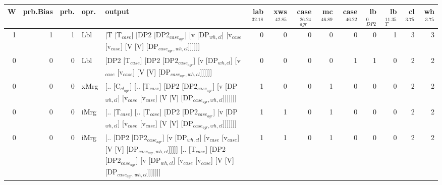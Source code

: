 \begin{tabularx}{\linewidth}{rrrlXrrrrrrrrr}
\hline
   W &   prb.Bias &   prb. & opr.   & output                                                                                                                                                                                 &   lab$^{32.18}$ &   xws$^{42.85}$ &   case$_{agr}^{26.24}$ &   mc$^{46.89}$ &   case$^{46.22}$ &   lb$_{DP2}^{0}$ &   lb$_{T}^{11.35}$ &   cl$^{3.75}$ &   wh$^{3.75}$ \\
\hline
   1 &       1 &   1 & Lbl  & [T [T$_{case}$] [DP2 [DP2$_{case_{agr}}$] [v [DP$_{wh,cl}$] [v$_{case}$ [v$_{case}$] [V [V] [DP$_{case_{agr},wh,cl}$]]]]]]                                                                                         &             0 &             0 &                  0 &            0 &              0 &            0 &              1 &        3 &        3 \\
   0 &       0 &   0 & Lbl  & [DP2 [T$_{case}$] [DP2 [DP2$_{case_{agr}}$] [v [DP$_{wh,cl}$] [v$_{case}$ [v$_{case}$] [V [V] [DP$_{case_{agr},wh,cl}$]]]]]]                                                                                       &             0 &             0 &                  0 &            0 &              1 &            1 &              0 &        2 &        2 \\
   0 &       0 &   0 & xMrg & [.. [C$_{cl_{agr}}$] [.. [T$_{case}$] [DP2 [DP2$_{case_{agr}}$] [v [DP$_{wh,cl}$] [v$_{case}$ [v$_{case}$] [V [V] [DP$_{case_{agr},wh,cl}$]]]]]]]                                                                        &             1 &             0 &                  0 &            1 &              0 &            0 &              0 &        2 &        2 \\
   0 &       0 &   0 & iMrg & [.. [T$_{case}$] [.. [T$_{case}$] [DP2 [DP2$_{case_{agr}}$] [v [DP$_{wh,cl}$] [v$_{case}$ [v$_{case}$] [V [V] [DP$_{case_{agr},wh,cl}$]]]]]]]                                                                          &             1 &             1 &                  0 &            1 &              0 &            0 &              0 &        2 &        2 \\
   0 &       0 &   0 & iMrg & [.. [DP2 [DP2$_{case_{agr}}$] [v [DP$_{wh,cl}$] [v$_{case}$ [v$_{case}$] [V [V] [DP$_{case_{agr},wh,cl}$]]]]] [.. [T$_{case}$] [DP2 [DP2$_{case_{agr}}$] [v [DP$_{wh,cl}$] [v$_{case}$ [v$_{case}$] [V [V] [DP$_{case_{agr},wh,cl}$]]]]]]] &             1 &             1 &                  0 &            1 &              0 &            0 &              0 &        2 &        2 \\

\end{tabularx}

